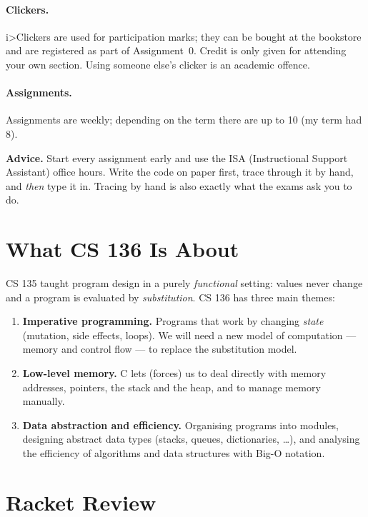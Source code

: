 \paragraph{Clickers.} i>Clickers are used for participation marks; they can be bought at the
bookstore and are registered as part of Assignment~0. Credit is only given for attending
your own section. Using someone else's clicker is an academic offence.

\paragraph{Assignments.} Assignments are weekly; depending on the term there are up to 10
(my term had 8).

\begin{aside}
\textbf{Advice.} Start every assignment early and use the ISA (Instructional Support
Assistant) office hours. Write the code on paper first, trace through it by hand, and
\emph{then} type it in. Tracing by hand is also exactly what the exams ask you to do.
\end{aside}

\section{What CS 136 Is About}

CS 135 taught program design in a purely \emph{functional} setting: values never change and
a program is evaluated by \emph{substitution}. CS 136 has three main themes:
\begin{enumerate}
  \item \textbf{Imperative programming.} Programs that work by changing \emph{state}
    (mutation, side effects, loops). We will need a new model of computation --- memory and
    control flow --- to replace the substitution model.
  \item \textbf{Low-level memory.} C lets (forces) us to deal directly with memory addresses,
    pointers, the stack and the heap, and to manage memory manually.
  \item \textbf{Data abstraction and efficiency.} Organising programs into modules, designing
    abstract data types (stacks, queues, dictionaries, \dots), and analysing the efficiency of
    algorithms and data structures with Big-O notation.
\end{enumerate}

\section{Racket Review}

